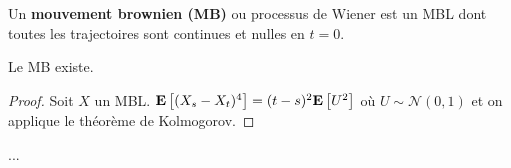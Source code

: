 	\begin{defn}
		Un \textbf{mouvement brownien (MB)} ou processus de Wiener est un MBL dont toutes les trajectoires sont continues et nulles en $t = 0$.
	\end{defn}
	
	\begin{pop}
		Le MB existe.
	\end{pop}
	
	\begin{proof}
		Soit $X$ un MBL.
		$\mathbf{E} \left[ (X_s - X_t)^4 \right] = (t - s)^2 \mathbf{E} \left[ U^2 \right]$ où $U \sim \mathcal{N}(0,1)$ et on applique le théorème de Kolmogorov.
	\end{proof}
	
	...
